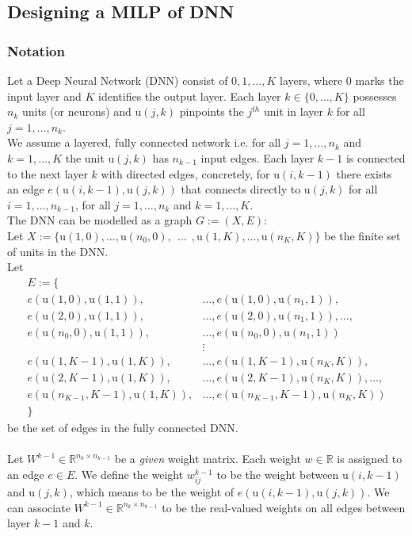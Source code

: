 \documentclass{article}
\begin{document}
\subsection{Designing a MILP of DNN}
\subsubsection{Notation}
Let a Deep Neural Network (DNN) consist of $0,1, \ldots, K$ layers, where $0$ marks the input layer and $K$ identifies the output layer. Each layer $k \in \{ 0, \ldots ,K \}$ possesses $n_k$ units (or neurons) and $\text{u}(j,k)$ pinpoints the $j^{th}$ unit in layer $k$ for all $j = 1, \ldots, n_k$.\\
We assume a layered, fully connected network i.e. for all $j=1, \ldots ,n_k$ and $k=1, \ldots, K$ the unit $\text{u}(j,k)$ has $n_{k-1}$ input edges.
Each layer $k-1$ is connected to the next layer $k$ with directed edges, concretely, for $\text{u}(i,k-1)$ there exists an edge $e(\text{u}(i,k-1),\text{u}(j,k))$ that connects directly to $\text{u}(j,k)$ for all $i=1, \ldots, n_{k-1}$, for all $j= 1, \ldots, n_k$ and $k=1, \ldots, K$.
\\
The DNN can be modelled as a graph $G:=(X,E)$:\\
Let $X := \{ \text{u}(1,0), \ldots ,\text{u}(n_0,0), \ \  \ldots \ \ ,\text{u}(1,K), \ldots ,\text{u}(n_K,K) \}$ be the finite set of units in the DNN.\\
Let 
\begin{align*}
E:= \{ \\
e(\text{u}(1,0),\text{u}(1,1)),& \ldots ,e(\text{u}(1,0),\text{u}(n_1,1)), \\
e(\text{u}(2,0),\text{u}(1,1)),& \ldots ,e(\text{u}(2,0),\text{u}(n_1,1)), \ldots ,\\
e(\text{u}(n_0,0),\text{u}(1,1)),& \ldots ,e(\text{u}(n_0,0),\text{u}(n_1,1)) \\
&\vdots \\
e(\text{u}(1,K-1),\text{u}(1,K)),& \ldots ,e(\text{u}(1,K-1),\text{u}(n_K,K)), \\
e(\text{u}(2,K-1),\text{u}(1,K)),& \ldots ,e(\text{u}(2,K-1),\text{u}(n_K,K)), \ldots , \\
e(\text{u}(n_{K-1},K-1),\text{u}(1,K)),& \ldots ,e(\text{u}(n_{K-1},K-1),\text{u}(n_K,K)) \\
\}
\end{align*}
be the set of edges in the fully connected DNN.\\
\\
Let $W^{k-1}\in \mathbb{R}^{n_k \times n_{k-1}}$ be a \textit{given} weight matrix. Each weight $w \in \mathbb{R}$ is assigned to an edge $e \in E$. We define the weight $w^{k-1}_{ij}$ to be the weight between $\text{u}(i,k-1)$ and $\text{u}(j,k)$, which means to be the weight of $e(\text{u}(i,k-1),\text{u}(j,k))$. We can associate $W^{k-1} \in \mathbb{R}^{n_k \times n_{k-1}}$ to be the real-valued weights on all edges between layer $k-1$ and $k$.\\
\end{document}
